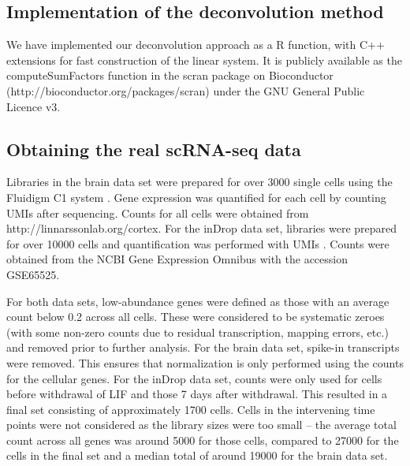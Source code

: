 \documentclass{bmcart}
\newcommand{\revised}[1]{#1}
\begin{document}
\subsection*{Implementation of the deconvolution method}
We have implemented our deconvolution approach as a R function, with C++ extensions for fast construction of the linear system.
\revised{It is publicly available as the computeSumFactors function in the scran package on Bioconductor ({http://bioconductor.org/packages/scran}) under the GNU General Public Licence v3.}

\subsection*{Obtaining the real scRNA-seq data}
Libraries in the brain data set were prepared for over 3000 single cells using the Fluidigm C1 system \cite{zeisel2015brain}.
Gene expression was quantified for each cell by counting UMIs after sequencing.
Counts for all cells were obtained from {http://linnarssonlab.org/cortex}.
For the inDrop data set, libraries were prepared for over 10000 cells and quantification was performed with UMIs \cite{klein2015droplet}.
Counts were obtained from the NCBI Gene Expression Omnibus with the accession GSE65525.

For both data sets, low-abundance genes were defined as those with an average count below 0.2 across all cells.
These were considered to be systematic zeroes (with some non-zero counts due to residual transcription, mapping errors, etc.) and removed prior to further analysis.
For the brain data set, spike-in transcripts were removed.
This ensures that normalization is only performed using the counts for the cellular genes.
For the inDrop data set, counts were only used for cells before withdrawal of LIF and those 7 days after withdrawal.
This resulted in a final set consisting of approximately 1700 cells.
Cells in the intervening time points were not considered as the library sizes were too small -- the average total count across all genes was around 5000 for those cells,
    compared to 27000 for the cells in the final set and a median total of around 19000 for the brain data set.
\end{document}

